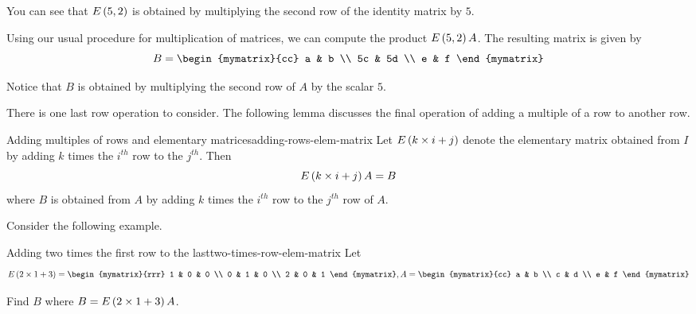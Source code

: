 \begin{solution}
You can see that $E \left(5, 2\right)$ is obtained by multiplying the second row 
of the identity matrix by $5$.

Using our usual procedure for multiplication of matrices, we can compute the product $E \left(5, 2\right)A$. The 
resulting matrix is given by 
\begin{equation*}
B
=\begin{mymatrix}{cc}
a & b \\
5c & 5d \\
e & f
\end{mymatrix}
\end{equation*}

Notice that $B$ is obtained by multiplying the second row of $A$ by the scalar $5$. 
\end{solution}

There is one last row operation to consider. The following lemma discusses the final
operation of adding a multiple of a row to another row.

\begin{lemma}{Adding multiples of rows and elementary matrices}{adding-rows-elem-matrix}
Let $E\left(k \times i+j\right) $ denote the elementary
matrix obtained from $I$ by adding $k$ times the $i^{th}$ row to the $j^{th}$. Then
\begin{equation*}
E\left(k \times i+j\right) A=B
\end{equation*}
where $B$ is obtained from $A$ by adding $k$ times the $i^{th}$ row to the $j^{th}$ row of $A.$
\end{lemma}

Consider the following example.

\begin{example}{Adding two times the first row to the last}{two-times-row-elem-matrix}
Let
\begin{equation*}
E\tup{2 \times 1+3} = \begin{mymatrix}{rrr}
1 & 0 & 0 \\
0 & 1 & 0 \\
2 & 0 & 1
\end{mymatrix}, A =  \begin{mymatrix}{cc}
a & b \\
c & d \\
e & f
\end{mymatrix} 
\end{equation*}

Find $B$ where $B = E\left(2 \times 1+3\right)A$.
\end{example}

